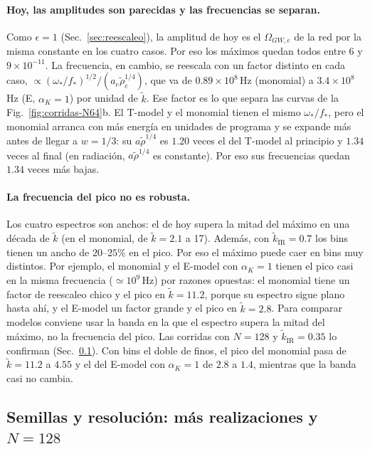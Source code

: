 \documentclass[11pt]{article}
\begin{document}
            \paragraph{Hoy, las amplitudes son parecidas y las frecuencias se separan.} Como $\epsilon = 1$ (Sec.~\ref{sec:reescaleo}), la amplitud de hoy es el $\Omega_{GW,e}$ de la red por la misma constante en los cuatro casos. Por eso los máximos quedan todos entre $6$ y $9 \times 10^{-11}$. La frecuencia, en cambio, se reescala con un factor distinto en cada caso, $\propto (\omega_*/f_*)^{1/2}/(a_e\tilde\rho_e^{1/4})$, que va de $0.89 \times 10^8$\,Hz (monomial) a $3.4 \times 10^8$\,Hz (E, $\alpha_K = 1$) por unidad de $\tilde k$. Ese factor es lo que separa las curvas de la Fig.~\ref{fig:corridas-N64}b. El T-model y el monomial tienen el mismo $\omega_*/f_*$, pero el monomial arranca con más energía en unidades de programa y se expande más antes de llegar a $w = 1/3$: su $a\tilde\rho^{1/4}$ es $1.20$ veces el del T-model al principio y $1.34$ veces al final (en radiación, $a\tilde\rho^{1/4}$ es constante). Por eso sus frecuencias quedan $1.34$ veces más bajas.

            \paragraph{La frecuencia del pico no es robusta.} Los cuatro espectros son anchos: el de hoy supera la mitad del máximo en una década de $\tilde k$ (en el monomial, de $\tilde k = 2.1$ a 17). Además, con $\tilde k_{\text{IR}} = 0.7$ los bins tienen un ancho de $20$--$25\%$ en el pico. Por eso el máximo puede caer en bins muy distintos. Por ejemplo, el monomial y el E-model con $\alpha_K = 1$ tienen el pico casi en la misma frecuencia ($\simeq 10^9$\,Hz) por razones opuestas: el monomial tiene un factor de reescaleo chico y el pico en $\tilde k = 11.2$, porque su espectro sigue plano hasta ahí, y el E-model un factor grande y el pico en $\tilde k = 2.8$. Para comparar modelos conviene usar la banda en la que el espectro supera la mitad del máximo, no la frecuencia del pico. Las corridas con $N = 128$ y $\tilde k_{\text{IR}} = 0.35$ lo confirman (Sec.~\ref{sec:semillas-N128}). Con bins el doble de finos, el pico del monomial pasa de $\tilde k = 11.2$ a $4.55$ y el del E-model con $\alpha_K = 1$ de $2.8$ a $1.4$, mientras que la banda casi no cambia.

        \subsection{Semillas y resolución: más realizaciones y $N = 128$}
            \label{sec:semillas-N128}
\end{document}
